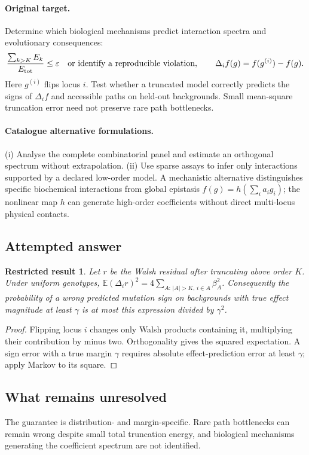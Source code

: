 \documentclass[11pt]{article}
\newcommand{\E}{\mathbb E}
\providecommand{\E}{\mathbb E}
\newtheorem{attemptresult}{Restricted result}[section]
\begin{document}
\paragraph{Original target.}
Determine which biological mechanisms predict interaction spectra and evolutionary consequences:
\[
\frac{\sum_{k>K}E_k}{E_{\rm tot}}\leq\varepsilon
\quad\text{or identify a reproducible violation},
\qquad
\Delta_if(g)=f(g^{(i)})-f(g).
\]
Here $g^{(i)}$ flips locus $i$. Test whether a truncated model correctly predicts the signs of $\Delta_i f$ and accessible paths on held-out backgrounds. Small mean-square truncation error need not preserve rare path bottlenecks.
\paragraph{Catalogue alternative formulations.}
(i) Analyse the complete combinatorial panel and estimate an orthogonal spectrum without extrapolation. (ii) Use sparse assays to infer only interactions supported by a declared low-order model. A mechanistic alternative distinguishes specific biochemical interactions from global epistasis $f(g)=h(\sum_i a_i g_i)$; the nonlinear map $h$ can generate high-order coefficients without direct multi-locus physical contacts.
\subsection{Attempted answer}
\begin{attemptresult}
Let $r$ be the Walsh residual after truncating above order $K$. Under uniform genotypes, $\E(\Delta_i r)^2=4\sum_{A:\,|A|>K,\,i\in A}\beta_A^2$. Consequently the probability of a wrong predicted mutation sign on backgrounds with true effect magnitude at least $\gamma$ is at most this expression divided by $\gamma^2$.
\end{attemptresult}
\begin{proof}
Flipping locus $i$ changes only Walsh products containing it, multiplying their contribution by minus two. Orthogonality gives the squared expectation. A sign error with a true margin $\gamma$ requires absolute effect-prediction error at least $\gamma$; apply Markov to its square.
\end{proof}
\subsection{What remains unresolved}
The guarantee is distribution- and margin-specific. Rare path bottlenecks can remain wrong despite small total truncation energy, and biological mechanisms generating the coefficient spectrum are not identified.
\end{document}
